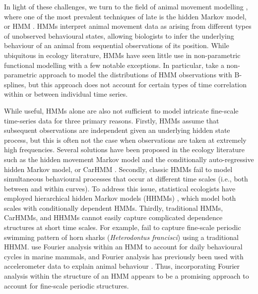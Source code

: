 In light of these challenges, we turn to the field of
animal movement modelling \citep{Hooten:2017}, where one of the most prevalent techniques of late is the hidden Markov model, or HMM \citep{Patterson:2017,McClintock:2020}. HMMs interpret animal movement data as arising from different types of unobserved behavioural states, allowing biologists to infer the underlying behaviour of an animal from sequential observations of its position. While ubiquitous in ecology literature, HMMs have seen little use in non-parametric functional modelling with a few notable exceptions. In particular, \citet{Langrock:2018} take a non-parametric approach to model the distributions of HMM observations with B-splines, 
but this approach does not account for certain types of time correlation within or between individual time series.

While useful, HMMs alone are also not sufficient to model intricate fine-scale time-series data for three primary reasons.
%
Firstly, HMMs assume that subsequent observations are independent given an underlying hidden state process, but this is often not the case when observations are taken at extremely high frequencies. 
Several solutions have been proposed in the ecology literature such as the hidden movement Markov model \citep{Whoriskey:2016} and the conditionally auto-regressive hidden Markov model, or CarHMM \citep{Lawler:2019}. 
%
Secondly, classic HMMs fail to model simultaneous behavioural processes that occur at different time scales (i.e., both between and within curves). 
To address this issue, statistical ecologists have employed hierarchical hidden Markov models (HHMMs) \citep{Barajas:2017,Adam:2019}, which model both scales with conditionally dependent HMMs.
%
Thirdly, traditional HMMs, CarHMMs, and HHMMs cannot easily capture complicated dependence structures at short time scales. For example, \citet{Adam:2019} fail to capture fine-scale periodic swimming pattern of horn sharks (\textit{Heterodontus francisci}) using a traditional HHMM. \citet{Heerah:2017} use Fourier analysis within an HMM to account for %
daily behavioural cycles in marine mammals, and Fourier analysis has previously been used with accelerometer data to explain animal behaviour \citep{Fehlmann:2017,Shorter:2017}. Thus, incorporating Fourier analysis within the structure of an HMM appears to be a promising approach to account for fine-scale periodic structures.

